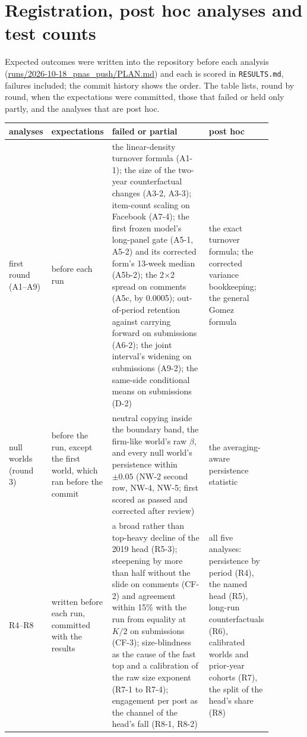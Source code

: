 \documentclass[10pt]{article}
\begin{document}
\section{Registration, post hoc analyses and test counts}\label{sec:registered}
Expected outcomes were written into the repository before each analysis (\url{runs/2026-10-18_pnas_push/PLAN.md}) and each is scored in \texttt{RESULTS.md}, failures included; the commit history shows the order. The table lists, round by round, when the expectations were committed, those that failed or held only partly, and the analyses that are post hoc.
{\small
\begin{longtable}{>{\raggedright\arraybackslash}p{0.14\linewidth}>{\raggedright\arraybackslash}p{0.17\linewidth}>{\raggedright\arraybackslash}p{0.37\linewidth}>{\raggedright\arraybackslash}p{0.2\linewidth}}
\toprule
analyses & expectations & failed or partial & post hoc\\
\midrule
\endhead
first round (A1--A9) & before each run & the linear-density turnover formula (A1-1); the size of the two-year counterfactual changes (A3-2, A3-3); item-count scaling on Facebook (A7-4); the first frozen model's long-panel gate (A5-1, A5-2) and its corrected form's 13-week median (A5b-2); the 2$\times$2 spread on comments (A5c, by 0.0005); out-of-period retention against carrying forward on submissions (A6-2); the joint interval's widening on submissions (A9-2); the same-side conditional means on submissions (D-2) & the exact turnover formula; the corrected variance bookkeeping; the general Gomez formula\\
null worlds (round 3) & before the run, except the first world, which ran before the commit & neutral copying inside the boundary band, the firm-like world's raw $\beta$, and every null world's persistence within $\pm0.05$ (NW-2 second row, NW-4, NW-5; first scored as passed and corrected after review) & the averaging-aware persistence statistic\\
R4--R8 & written before each run, committed with the results & a broad rather than top-heavy decline of the 2019 head (R5-3); steepening by more than half without the slide on comments (CF-2) and agreement within 15\% with the run from equality at $K/2$ on submissions (CF-3); size-blindness as the cause of the fast top and a calibration of the raw size exponent (R7-1 to R7-4); engagement per post as the channel of the head's fall (R8-1, R8-2) & all five analyses: persistence by period (R4), the named head (R5), long-run counterfactuals (R6), calibrated worlds and prior-year cohorts (R7), the split of the head's share (R8)\\

\end{longtable}}
\end{document}
